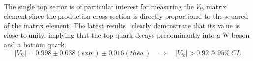 \\
The single top sector is of particular interest for measuring the $V_{tb}$ matrix element since the production cross-section is directly proportional to the squared of the matrix element. The latest results~\cite{CMSVtbResult} clearly demonstrate that its value is close to unity, implying that the top quark decays predominantly into a W-boson and a bottom quark. 
\begin{equation}
 \vert V_{tb} \vert = 0.998 \pm 0.038 (exp.) \pm 0.016 (theo.) \quad \Rightarrow \quad \vert V_{tb} \vert > 0.92 ~ @ ~ 95 \% ~ CL
\end{equation}


